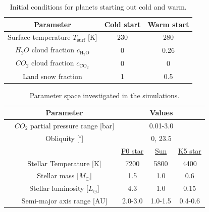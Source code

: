 \documentclass[fleqn,usenatbib]{mnras}
\begin{document}
\begin{table}
	\centering
	\caption{Initial conditions for planets starting out cold and warm.}
	\label{tab:ic}
	\begin{tabular}{ccc} 
		\hline
		Parameter & \textbf{Cold start} & \textbf{Warm start} \\
		\hline
		Surface temperature $T_{\mathrm{surf}}$ [K] & 230 & 280 \\
		$H_{\mathrm{2}}O$ cloud fraction $c_{\mathrm{H_{\mathrm{2}}O}}$ & 0 & 0.26  \\
		$CO_{\mathrm{2}}$ cloud fraction $c_{\mathrm{CO_{\mathrm{2}}}}$ & 0 & 0 \\
		Land snow fraction & 1 & 0.5 \\
		\hline
	\end{tabular}
\end{table}


\begin{table}
	\centering
	\caption{Parameter space investigated in the simulations.}
	\label{tab:parameters}
	\begin{tabular}{ccccc}
		\hline
		&\multicolumn{1}{c}{Parameter}&\multicolumn{3}{c}{Values}\\
		\hline
		&\multicolumn{1}{c}{$CO_{\mathrm{2}}$ partial pressure range [bar]}&\multicolumn{3}{c}{0.01-3.0}\\
		&\multicolumn{1}{c}{Obliquity [$^{\circ}$] }&\multicolumn{3}{c}{0, 23.5}\\
		&\multicolumn{1}{c}{}&\multicolumn{1}{c}{\underline{F0 star}}&\multicolumn{1}{c}{\underline{Sun}}&\multicolumn{1}{c}{\underline{K5 star}}\\
		&\multicolumn{1}{c}{Stellar Temperature [K]}&\multicolumn{1}{c}{7200}&\multicolumn{1}{c}{5800}&\multicolumn{1}{c}{4400}\\
		&\multicolumn{1}{c}{Stellar mass [$M_{\odot}$]}&\multicolumn{1}{c}{1.5}&\multicolumn{1}{c}{1.0}&\multicolumn{1}{c}{0.6}\\
		&\multicolumn{1}{c}{Stellar luminosity [$L_{\odot}$]}&\multicolumn{1}{c}{4.3}&\multicolumn{1}{c}{1.0}&\multicolumn{1}{c}{0.15}\\
		&\multicolumn{1}{c}{Semi-major axis range [AU]}&\multicolumn{1}{c}{2.0-3.0}&\multicolumn{1}{c}{1.0-1.5}&\multicolumn{1}{c}{0.4-0.6}\\
		\hline
	\end{tabular}
\end{table}
\end{document}
